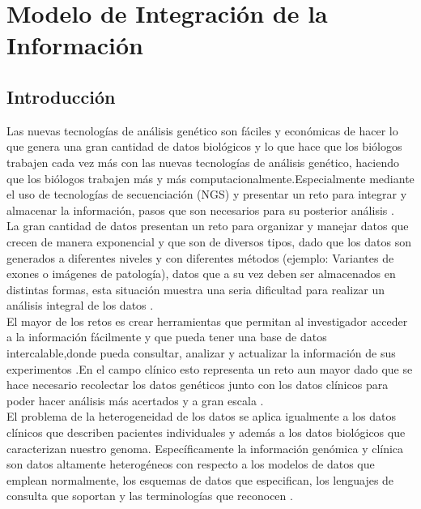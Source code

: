 \chapter{Modelo de Integración de la Información}
\section{Introducción}

Las nuevas tecnologías de análisis genético son fáciles y económicas de hacer lo que genera una gran cantidad de datos biológicos y lo que hace que los biólogos trabajen cada vez más con las nuevas tecnologías de análisis genético, haciendo que los biólogos trabajen más y más computacionalmente.Especialmente mediante el uso de  tecnologías de secuenciación (NGS) y presentar un reto para integrar y almacenar la información, pasos que son necesarios para su posterior análisis \cite{Li2014,Cook2016}.\\

La gran cantidad de datos presentan un reto para organizar y manejar datos que crecen de manera exponencial y que son de diversos tipos, dado que los datos son generados a diferentes niveles y con diferentes métodos (ejemplo: Variantes de exones o imágenes de patología), datos que a su vez deben ser almacenados en distintas formas, esta situación muestra una seria dificultad para realizar un análisis integral de los datos \cite{Cook2016,Li2014}.\\

El mayor de los retos es crear herramientas que permitan al investigador acceder a la información fácilmente y que pueda tener una base de datos intercalable,donde pueda consultar, analizar y actualizar la información de sus experimentos \cite{Li2014}.En el campo clínico esto representa un reto aun mayor dado que se hace necesario recolectar los datos genéticos junto con los datos clínicos para poder hacer análisis más acertados y a gran escala \cite{Paila2013}.\\

El problema de la heterogeneidad  de los datos  se aplica igualmente a los datos clínicos que describen pacientes individuales y además a los datos biológicos que caracterizan nuestro genoma. Específicamente la información genómica y clínica son datos altamente heterogéneos con respecto a los modelos de datos que emplean normalmente, los esquemas de datos que especifican, los lenguajes de consulta que soportan y las terminologías que reconocen \cite{Sujansky2001}.\\

